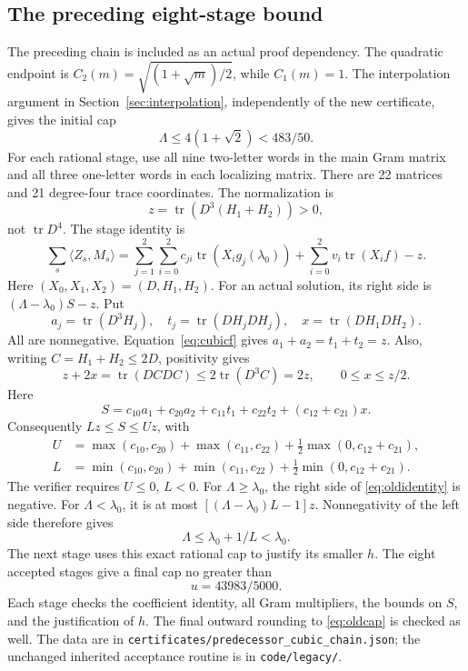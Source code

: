 \documentclass[11pt]{article}
\newcommand{\tr}{\operatorname{tr}}
\theoremstyle{remark}\newtheorem{remark}[theorem]{Remark}
\begin{document}
\subsection{The preceding eight-stage bound}
The preceding chain is included as an actual proof dependency. The quadratic endpoint \cite{quadratic} is
\(C_2(m)=\sqrt{(1+\sqrt m)/2}\), while \(C_1(m)=1\). The interpolation argument in Section~\ref{sec:interpolation}, independently of the new certificate, gives the initial cap
\[
 \Lambda\le4(1+\sqrt2)<483/50.
\]
For each rational stage, use all nine two-letter words in the main Gram matrix and all three one-letter words in each localizing matrix. There are 22 matrices and 21 degree-four trace coordinates. The normalization is
\[
 z=\tr(D^3(H_1+H_2))>0,
\]
not \(\tr D^4\). The stage identity is
\begin{equation}\label{eq:oldidentity}
 \sum_s\langle Z_s,M_s\rangle
 =\sum_{j=1}^2\sum_{i=0}^2c_{ji}\tr(X_i g_j(\lambda_0))
   +\sum_{i=0}^2v_i\tr(X_i f)-z.
\end{equation}
Here $(X_0,X_1,X_2)=(D,H_1,H_2)$. For an actual solution, its right side is \((\Lambda-\lambda_0)S-z\). Put
\[
 a_j=\tr(D^3H_j),\quad t_j=\tr(DH_jDH_j),\quad x=\tr(DH_1DH_2).
\]
All are nonnegative. Equation~\eqref{eq:cubicf} gives
\(a_1+a_2=t_1+t_2=z\). Also, writing \(C=H_1+H_2\le2D\), positivity gives
\[
 z+2x=\tr(DCDC)\le2\tr(D^3C)=2z,
 \qquad 0\le x\le z/2.
\]
Here
\[
 S=c_{10}a_1+c_{20}a_2+c_{11}t_1+c_{22}t_2+(c_{12}+c_{21})x.
\]
Consequently \(Lz\le S\le Uz\), with
\begin{align*}
 U&=\max(c_{10},c_{20})+\max(c_{11},c_{22})
       +\tfrac12\max(0,c_{12}+c_{21}),\\
 L&=\min(c_{10},c_{20})+\min(c_{11},c_{22})
       +\tfrac12\min(0,c_{12}+c_{21}).
\end{align*}
The verifier requires \(U\le0\), \(L<0\). For \(\Lambda\ge\lambda_0\), the right side of \eqref{eq:oldidentity} is negative. For \(\Lambda<\lambda_0\), it is at most \([(\Lambda-\lambda_0)L-1]z\). Nonnegativity of the left side therefore gives
\[
 \Lambda\le\lambda_0+1/L<\lambda_0.
\]
The next stage uses this exact rational cap to justify its smaller \(h\). The eight accepted stages give a final cap no greater than
\begin{equation}\label{eq:oldcap}
 u=43983/5000.
\end{equation}
Each stage checks the coefficient identity, all Gram multipliers, the bounds on \(S\), and the justification of \(h\). The final outward rounding to \eqref{eq:oldcap} is checked as well. The data are in \texttt{certificates/predecessor\_cubic\_chain.json}; the unchanged inherited acceptance routine is in \texttt{code/legacy/}.
\end{document}
